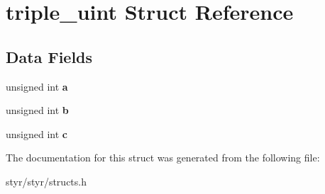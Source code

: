 \hypertarget{structtriple__uint}{}\section{triple\+\_\+uint Struct Reference}
\label{structtriple__uint}
\subsection*{Data Fields}
\begin{DoxyCompactItemize}
\item 
unsigned int {\bfseries a}\hypertarget{structtriple__uint_a0ea8a85723620c90be9fd2a693f12a59}{}\label{structtriple__uint_a0ea8a85723620c90be9fd2a693f12a59}

\item 
unsigned int {\bfseries b}\hypertarget{structtriple__uint_a790d5baa17ec7aaf7bb49750a16e9c29}{}\label{structtriple__uint_a790d5baa17ec7aaf7bb49750a16e9c29}

\item 
unsigned int {\bfseries c}\hypertarget{structtriple__uint_a6ce17b018c47d0f1d0e53a458f741ad3}{}\label{structtriple__uint_a6ce17b018c47d0f1d0e53a458f741ad3}

\end{DoxyCompactItemize}


The documentation for this struct was generated from the following file\+:\begin{DoxyCompactItemize}
\item 
styr/styr/structs.\+h\end{DoxyCompactItemize}

